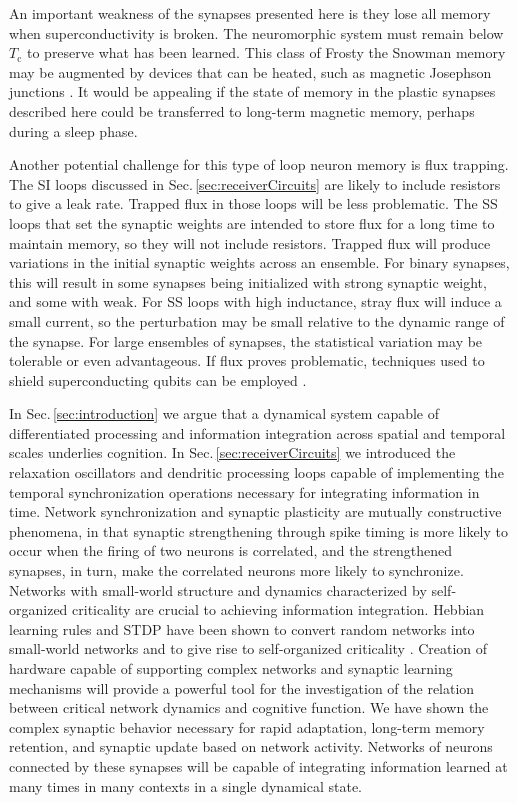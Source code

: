 \documentclass[twocolumn]{article}
\begin{document}
An important weakness of the synapses presented here is they lose all memory when superconductivity is broken. The neuromorphic system must remain below $T_{\mathrm{c}}$ to preserve what has been learned. This class of Frosty the Snowman memory may be augmented by devices that can be heated, such as magnetic Josephson junctions \cite{ru2016,scdo2017,scdo2018}. It would be appealing if the state of memory in the plastic synapses described here could be transferred to long-term magnetic memory, perhaps during a sleep phase.

Another potential challenge for this type of loop neuron memory is flux trapping. The SI loops discussed in Sec.\,\ref{sec:receiverCircuits} are likely to include resistors to give a leak rate. Trapped flux in those loops will be less problematic. The SS loops that set the synaptic weights are intended to store flux for a long time to maintain memory, so they will not include resistors. Trapped flux will produce variations in the initial synaptic weights across an ensemble. For binary synapses, this will result in some synapses being initialized with strong synaptic weight, and some with weak. For SS loops with high inductance, stray flux will induce a small current, so the perturbation may be small relative to the dynamic range of the synapse. For large ensembles of synapses, the statistical variation may be tolerable or even advantageous. If flux proves problematic, techniques used to shield superconducting qubits can be employed \cite{coch2011}.

In Sec.\,\ref{sec:introduction} we argue that a dynamical system capable of differentiated processing and information integration across spatial and temporal scales underlies cognition. In Sec.\,\ref{sec:receiverCircuits} we introduced the relaxation oscillators and dendritic processing loops capable of implementing the temporal synchronization operations necessary for integrating information in time. Network synchronization and synaptic plasticity are mutually constructive phenomena, in that synaptic strengthening through spike timing is more likely to occur when the firing of two neurons is correlated, and the strengthened synapses, in turn, make the correlated neurons more likely to synchronize. Networks with small-world structure \cite{wast1998,sp2010} and dynamics characterized by self-organized criticality are crucial to achieving information integration. Hebbian learning rules and STDP have been shown to convert random networks into small-world networks and to give rise to self-organized criticality \cite{siqu2007,rusp2011}. Creation of hardware capable of supporting complex networks and synaptic learning mechanisms will provide a powerful tool for the investigation of the relation between critical network dynamics and cognitive function. We have shown the complex synaptic behavior necessary for rapid adaptation, long-term memory retention, and synaptic update based on network activity. Networks of neurons connected by these synapses will be capable of integrating information learned at many times in many contexts in a single dynamical state.
\end{document}
